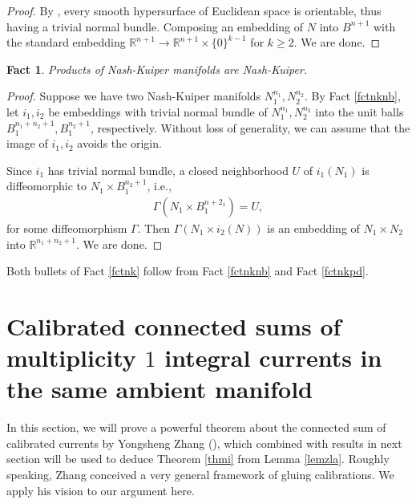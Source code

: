 \documentclass[11pt,a4paper]{amsart}
\numberwithin{equation}{section}
\newcommand{\Ga}{\Gamma}
\newcommand{\R}{\mathbb{R}}
\theoremstyle{plain}
\newtheorem{fact}[exam]{Fact}
\theoremstyle{definition}
\numberwithin{equation}{subsection}
\begin{document}
	\begin{proof}
		By	\cite{HSoh}, every smooth hypersurface of Euclidean space is orientable, thus having a trivial normal bundle. Composing an embedding of $N$ into $B^{n+1}$ with the standard embedding $\R^{n+1}\to\R^{n+1}\times\{0\}^{k-1}$ for $k\ge 2.$ We are done.
	\end{proof}
	\begin{fact}
		Products of Nash-Kuiper manifolds are Nash-Kuiper.
	\end{fact}
	\begin{proof}\label{fctnkpd}
		Suppose we have two Nash-Kuiper manifolds $N_1^{n_1},N_2^{n_2}$. By Fact \ref{fctnknb}, let $i_1,i_2$ be embeddings with trivial normal bundle of $N_1^{n_1},N_2^{n_2}$ into the unit balls $B_1^{n_1+n_2+1},B_1^{n_2+1}$, respectively. Without loss of generality, we can assume that the image of $i_1,i_2$ avoids the origin.
		
		Since $i_1$ has trivial normal bundle, a closed neighborhood $U$ of $i_1(N_1)$ is diffeomorphic to $N_1\times B_1^{n_2+1}$, i.e.,
		\begin{align*}
			\Ga(N_1\times B_1^{n+2_1})=U,
		\end{align*}for some diffeomorphism $\Ga.$ Then $\Ga(N_1\times i_2(N))$ is an embedding of $N_1\times N_2$ into $\R^{n_1+n_2+1}.$ We are done.
	\end{proof}
	Both bullets of Fact \ref{fctnk} follow from Fact \ref{fctnknb} and Fact \ref{fctnkpd}.
	\section{Calibrated connected sums of multiplicity $1$ integral currents in the same ambient manifold}\label{seccs}
	In this section, we will prove a powerful theorem about the connected sum of calibrated currents by Yongsheng Zhang (\cite{YZa,YZj}), which combined with results in next section will be used to deduce Theorem \ref{thmi} from Lemma \ref{lemzla}. Roughly speaking, Zhang conceived a very general framework of gluing calibrations. We apply his vision to our argument here.
	
\end{document}

